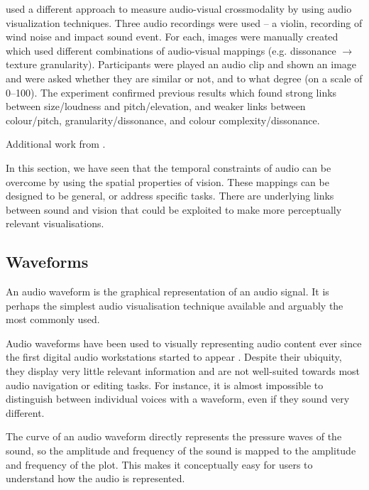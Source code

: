 \citet{Tsiros2014} used a different approach to measure audio-visual crossmodality by using audio visualization
techniques.  Three audio recordings were used -- a violin, recording of wind noise and impact sound event. For each,
images were manually created which used different combinations of audio-visual mappings (e.g. dissonance $\to$ texture
granularity). Participants were played an audio clip and shown an image and were asked whether they are similar or not,
and to what degree (on a scale of 0--100).  The experiment confirmed previous results which found strong links between
size/loudness and pitch/elevation, and weaker links between colour/pitch, granularity/dissonance, and colour
complexity/dissonance.

Additional work from \citet{Marks2003}.


In this section, we have seen that the temporal constraints of audio can be overcome by using the spatial properties of
vision. These mappings can be designed to be general, or address specific tasks. There are underlying links between
sound and vision that could be exploited to make more perceptually relevant visualisations.

\subsection{Waveforms}

An audio waveform is the graphical representation of an audio signal. It is perhaps the simplest audio visualisation
technique available and arguably the most commonly used.

Audio waveforms have been used to visually representing audio content ever since the first digital audio workstations
started to appear \citep{Massie1985}. Despite their ubiquity, they display very little relevant information and are not
well-suited towards most audio navigation or editing tasks. For instance, it is almost impossible to distinguish
between individual voices with a waveform, even if they sound very different.


The curve of an audio waveform directly represents the pressure waves of the sound, so the amplitude and frequency of
the sound is mapped to the amplitude and frequency of the plot. This makes it conceptually easy for users to
understand how the audio is represented.

